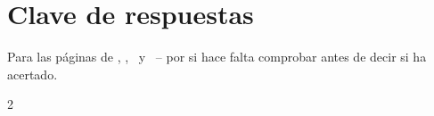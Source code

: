 \section*{Clave de respuestas}

Para las páginas de \lblAdivina, \lblUne, \lblEncuentra\ y \lblSiNo\ --
por si hace falta comprobar antes de decir si ha acertado.

\begin{multicols}{2}
\footnotesize
\begin{itemize}[leftmargin=0mm, label={}, itemsep=2mm, topsep=0mm]

\end{itemize}
\end{multicols}
\newpage
